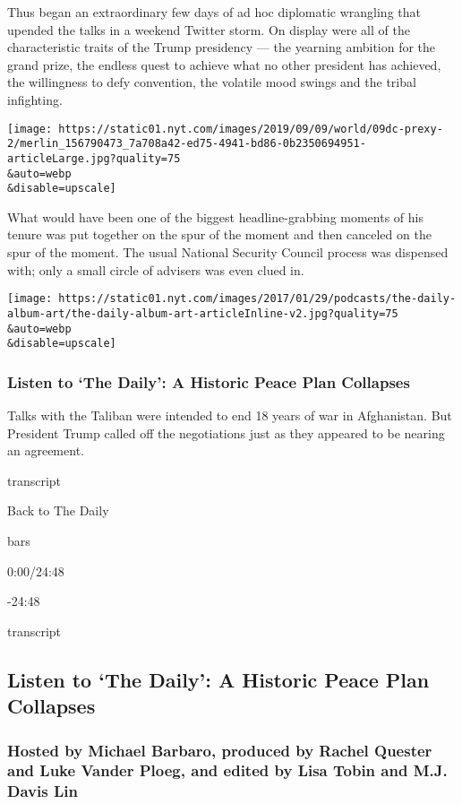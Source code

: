 Thus began an extraordinary few days of ad hoc diplomatic wrangling that
upended the talks in a weekend Twitter storm. On display were all of the
characteristic traits of the Trump presidency --- the yearning ambition
for the grand prize, the endless quest to achieve what no other
president has achieved, the willingness to defy convention, the volatile
mood swings and the tribal infighting.

\texttt{[image: https://static01.nyt.com/images/2019/09/09/world/09dc-prexy-2/merlin\_156790473\_7a708a42-ed75-4941-bd86-0b2350694951-articleLarge.jpg?quality=75\\\&auto=webp\\\&disable=upscale]}

What would have been one of the biggest headline-grabbing moments of his
tenure was put together on the spur of the moment and then canceled on
the spur of the moment. The usual National Security Council process was
dispensed with; only a small circle of advisers was even clued in.

\texttt{[image: https://static01.nyt.com/images/2017/01/29/podcasts/the-daily-album-art/the-daily-album-art-articleInline-v2.jpg?quality=75\\\&auto=webp\\\&disable=upscale]}

\hypertarget{listen-to-the-daily-a-historic-peace-plan-collapses}{%
\subsubsection{Listen to `The Daily': A Historic Peace Plan
Collapses}\label{listen-to-the-daily-a-historic-peace-plan-collapses}}

Talks with the Taliban were intended to end 18 years of war in
Afghanistan. But President Trump called off the negotiations just as
they appeared to be nearing an agreement.

transcript

Back to The Daily

bars

0:00/24:48

-24:48

transcript

\hypertarget{listen-to-the-daily-a-historic-peace-plan-collapses-1}{%
\subsection{Listen to `The Daily': A Historic Peace Plan
Collapses}\label{listen-to-the-daily-a-historic-peace-plan-collapses-1}}

\hypertarget{hosted-by-michael-barbaro-produced-by-rachel-quester-and-luke-vander-ploeg-and-edited-by-lisa-tobin-and-mj-davis-lin}{%
\subsubsection{Hosted by Michael Barbaro, produced by Rachel Quester and
Luke Vander Ploeg, and edited by Lisa Tobin and M.J. Davis
Lin}\label{hosted-by-michael-barbaro-produced-by-rachel-quester-and-luke-vander-ploeg-and-edited-by-lisa-tobin-and-mj-davis-lin}}

